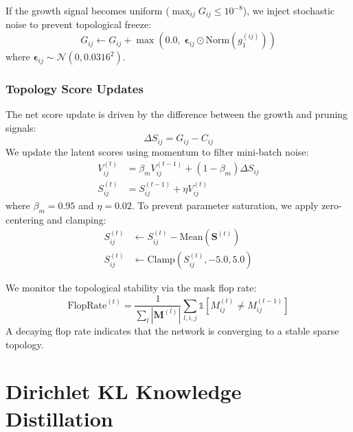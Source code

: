 \documentclass[11pt]{article}
\begin{document}
If the growth signal becomes uniform ($\max_{ij} G_{ij} \le 10^{-8}$), we inject stochastic noise to prevent topological freeze:
\begin{equation}\label{eq:anti_crystal}
    G_{ij} \leftarrow G_{ij} + \max\!\left(0.0,\; \bm{\epsilon}_{ij} \odot \text{Norm}(g_1^{(ij)})\right)
\end{equation}
where $\bm{\epsilon}_{ij} \sim \mathcal{N}(0, 0.0316^2)$.

\subsubsection{Topology Score Updates}

The net score update is driven by the difference between the growth and pruning signals:
\begin{equation}\label{eq:delta_S}
    \Delta S_{ij} = G_{ij} - C_{ij}
\end{equation}
We update the latent scores using momentum to filter mini-batch noise:
\begin{align}
    V_{ij}^{(t)} &= \beta_m V_{ij}^{(t-1)} + (1 - \beta_m) \Delta S_{ij} \label{eq:momentum} \\
    S_{ij}^{(t)} &= S_{ij}^{(t-1)} + \eta V_{ij}^{(t)} \label{eq:score_update}
\end{align}
where $\beta_m = 0.95$ and $\eta = 0.02$. To prevent parameter saturation, we apply zero-centering and clamping:
\begin{align}
    S_{ij}^{(t)} &\leftarrow S_{ij}^{(t)} - \text{Mean}(\bm{S}^{(t)}) \label{eq:zero_center} \\
    S_{ij}^{(t)} &\leftarrow \text{Clamp}(S_{ij}^{(t)}, -5.0, 5.0) \label{eq:clamp}
\end{align}

We monitor the topological stability via the mask flop rate:
\begin{equation}\label{eq:flop_rate}
    \text{FlopRate}^{(t)} = \frac{1}{\sum_l |\bm{M}^{(l)}|} \sum_{l,i,j} \mathbb{1}\!\left[M_{ij}^{(t)} \ne M_{ij}^{(t-1)}\right]
\end{equation}
A decaying flop rate indicates that the network is converging to a stable sparse topology.

\section{Dirichlet KL Knowledge Distillation}\label{sec:distillation}
\end{document}
